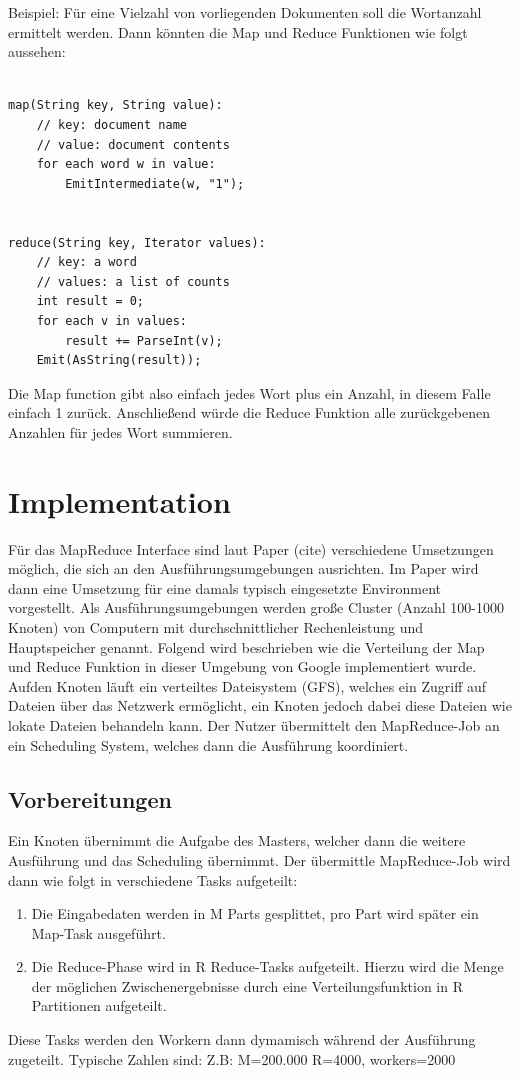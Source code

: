 Beispiel:
Für eine Vielzahl von vorliegenden Dokumenten soll die Wortanzahl ermittelt werden.
Dann könnten die Map und Reduce Funktionen wie folgt aussehen:

\begin{lstlisting}

map(String key, String value):
	// key: document name
	// value: document contents
	for each word w in value:
		EmitIntermediate(w, "1");


reduce(String key, Iterator values):
	// key: a word
	// values: a list of counts
	int result = 0;
	for each v in values:
		result += ParseInt(v);
	Emit(AsString(result));

\end{lstlisting}

Die Map function gibt also einfach jedes Wort plus ein Anzahl, in diesem Falle einfach 1 zurück.
Anschließend würde die Reduce Funktion alle zurückgebenen Anzahlen für jedes Wort summieren.



\section{Implementation}

Für das MapReduce Interface sind laut Paper (cite) verschiedene Umsetzungen möglich, die sich an den  Ausführungsumgebungen ausrichten.
Im Paper wird dann eine Umsetzung für eine damals typisch eingesetzte Environment vorgestellt.
Als Ausführungsumgebungen werden große Cluster (Anzahl 100-1000 Knoten) von Computern mit durchschnittlicher Rechenleistung und Hauptspeicher genannt.
Folgend wird beschrieben wie die Verteilung der Map und Reduce Funktion in dieser Umgebung von Google implementiert wurde.
Aufden Knoten läuft ein verteiltes Dateisystem (GFS), welches ein Zugriff auf Dateien über das Netzwerk ermöglicht, ein Knoten jedoch dabei diese Dateien wie lokate Dateien behandeln kann.
Der Nutzer übermittelt den MapReduce-Job an ein Scheduling System, welches dann die Ausführung koordiniert.


\subsection*{Vorbereitungen}
Ein Knoten übernimmt die Aufgabe des Masters, welcher dann die weitere Ausführung und das Scheduling übernimmt.
Der übermittle MapReduce-Job wird dann wie folgt in verschiedene Tasks aufgeteilt:
\begin{enumerate}
	\item
	Die Eingabedaten werden in M Parts gesplittet, pro Part wird später ein Map-Task ausgeführt.
	\item
	Die Reduce-Phase wird in R Reduce-Tasks aufgeteilt.
	Hierzu wird die Menge der möglichen Zwischenergebnisse
	durch eine Verteilungsfunktion in R Partitionen aufgeteilt.
\end{enumerate}
Diese Tasks werden den Workern dann dymamisch während der Ausführung zugeteilt.
Typische Zahlen sind: Z.B: M=200.000 R=4000, workers=2000

